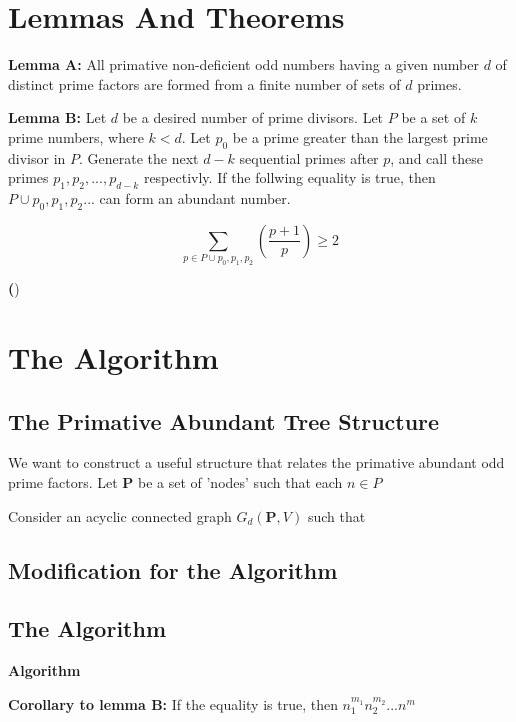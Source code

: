\documentclass[]{article}
\begin{document}
\section*{Lemmas And Theorems}\par\hspace{4ex}

\textbf{Lemma A:} All primative non-deficient odd numbers having a given number $d$ of distinct prime factors are formed from a finite number of sets of $d$ primes.

\par
\textbf{Lemma B:} Let $d$ be a desired number of prime divisors. Let $P$ be a set of $k$ prime numbers, where $k < d$. Let $p_0$ be a prime greater than the largest prime divisor in $P$. Generate the next $d - k$ sequential primes after $p$, and call these primes $p_1, p_2, ..., p_{d-k}$ respectivly. If the follwing equality is true, then $P \cup  {p_0, p_1, p_2}...$ can form an abundant number.



$$ \sum_{p \in P \cup {p_0, p_1, p_2}} (\frac{p+1}{p}) \geq 2 $$

\textbf()

\section{The Algorithm}

\subsection{The Primative Abundant Tree Structure}

We want to construct a useful structure that relates the primative
abundant odd prime factors. Let $\mathbf{P}$ be a set of 'nodes' 
such that each $n \in P $

Consider an acyclic connected graph $G_d(\mathbf{P},V)$ such that 

\subsection{Modification for the Algorithm}

\subsection{The Algorithm}
\textbf{Algorithm} 

\textbf{Corollary to lemma B:} If the equality is true, then $n^{m_1}_{1} n^{m_2}_{2} ... n^{m} $
\end{document}
